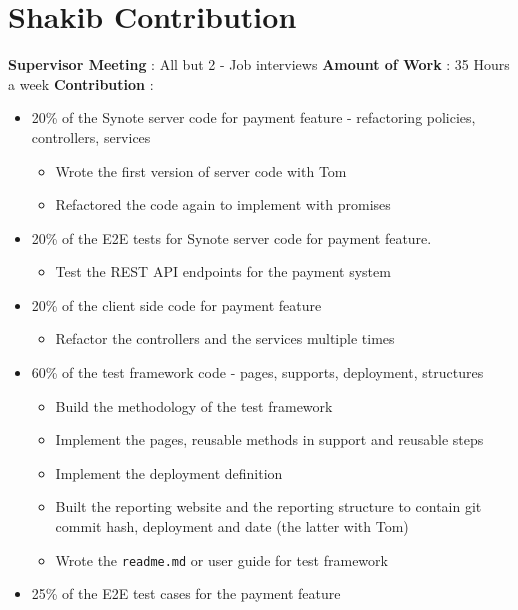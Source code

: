 \section{Shakib Contribution}
\label{sec:shakib-contribution}

\textbf{Supervisor Meeting} : All but 2 - Job interviews
\newline
\textbf{Amount of Work} : 35 Hours a week
\newline
\textbf{Contribution} :

\begin{itemize}
 \item 20\% of the Synote server code for payment feature - refactoring policies, controllers, services
 \begin{itemize}
  \item Wrote the first version of server code with Tom
  \item Refactored the code again to implement with promises
 \end{itemize}
 \item 20\% of the E2E tests for Synote server code for
  payment feature.
 \begin{itemize}
  \item Test the REST API endpoints for the payment system
 \end{itemize}
 \item 20\% of the client side code for payment feature
 \begin{itemize}
  \item Refactor the controllers and the services multiple times
 \end{itemize}
 \item 60\% of the test framework code - pages, supports, deployment, structures
 \begin{itemize}
  \item Build the methodology of the test framework
  \item Implement the pages, reusable methods in support and reusable steps
  \item Implement the deployment definition
  \item Built the reporting website and the reporting structure to contain git commit hash, deployment and date (the latter with Tom)
  \item Wrote the \texttt{readme.md} or user guide for test framework
 \end{itemize}
 \item 25\% of the E2E test cases for the payment feature
 \begin{itemize}

\end{itemize}
\end{itemize}
